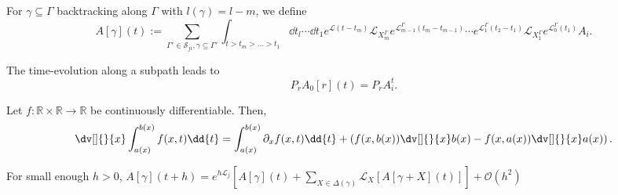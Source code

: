 \begin{defn}
  For \(\gamma \subseteq \Gamma \) backtracking along \(\Gamma \) with \(l(\gamma )=l-m\), we define 
  \[A[\gamma ](t) := \sum_{\Gamma ' \in \mathcal{S}_{ji},\gamma \subseteq \Gamma '}^{} \int_{t>t_m>\dots>t_1}^{}  \dd{t_l}\cdots \dd{t_1} e^{\mathcal{L}(t-t_m)}\mathcal{L}_{X_m^{\Gamma }}e^{\mathcal{L}_{m-1}^{\Gamma }(t_m-t_{m-1})}\cdots e^{\mathcal{L}_1^{\Gamma }(t_2-t_1)} \mathcal{L}_{X_1^{\Gamma }}e^{\mathcal{L}_0^{\Gamma }(t_1)} A_i.\]
\end{defn}

\begin{remark}[]
    The time-evolution along a subpath leads to 
    \[ P_r A_0[r](t) = P_r A_i^{t} .\]
\end{remark}

\begin{lem}[Leibniz]
  Let \( f: \mathbb{R} \times \mathbb{R} \to \mathbb{R} \) be continuously differentiable. Then,
  \[ \dv[]{}{x} \int_{a(x)}^{b(x)}  f(x,t)   \dd{t} = \int_{a(x)}^{b(x)} \partial_x f(x,t)  \dd{t} + \left(f(x,b(x)) \dv[]{}{x}b(x) - f(x,a(x)) \dv[]{}{x} a(x)\right). \]
\end{lem}


\begin{lem}[]
  \label{difftimeevol}
    For small enough \( h>0 \), 
    \( A[\gamma](t+h) = e^{h \mathcal{L}_j}\left[A[\gamma](t) + \sum_{X\in \Delta(\gamma)}^{} \mathcal{L}_X [A[\gamma+X](t) ]\right] + \mathcal{O}(h^{2})\)
\end{lem}

